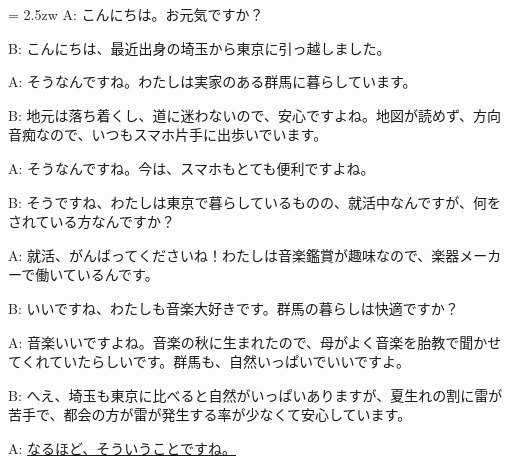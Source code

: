 \documentclass[11pt]{amsart}
\title{}
\author{}
\newenvironment{hangall}[1]{\hangindent = 2.5zw\everypar{\hangindent = 2.5zw}}{}
\begin{document}
\maketitle
\begin{hangall}{}%
A: こんにちは。お元気ですか？

B: こんにちは、最近出身の埼玉から東京に引っ越しました。

A: そうなんですね。わたしは実家のある群馬に暮らしています。

B: 地元は落ち着くし、道に迷わないので、安心ですよね。地図が読めず、方向音痴なので、いつもスマホ片手に出歩いでいます。

A: そうなんですね。今は、スマホもとても便利ですよね。

B: そうですね、わたしは東京で暮らしているものの、就活中なんですが、何をされている方なんですか？

A: 就活、がんばってくださいね！わたしは音楽鑑賞が趣味なので、楽器メーカーで働いているんです。

B: いいですね、わたしも音楽大好きです。群馬の暮らしは快適ですか？

A: 音楽いいですよね。音楽の秋に生まれたので、母がよく音楽を胎教で聞かせてくれていたらしいです。群馬も、自然いっぱいでいいですよ。

B: へえ、埼玉も東京に比べると自然がいっぱいありますが、夏生れの割に雷が苦手で、都会の方が雷が発生する率が少なくて安心しています。

A: \ul{なるほど、そういうことですね。}\end{hangall}
\end{document}
